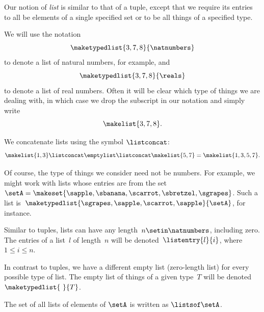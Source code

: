 Our notion of \emph{list} is similar to that of a tuple, except that we require its entries to all be elements of a single specified set or to be all things of a specified type.

We will use the notation
\begin{equation}
    \maketypedlist{3, 7, 8}{\natnumbers}
\end{equation}
to denote a list of natural numbers, for example, and
\begin{equation}
    \maketypedlist{3, 7, 8}{\reals}
\end{equation}
to denote a list of real numbers.
Often it will be clear which type of things we are dealing with, in which case we drop the subscript in our notation and simply write
\begin{equation}
    \makelist{3, 7, 8}.
\end{equation}

We concatenate lists using the symbol $\listconcat$:
\begin{equation}
    \makelist{1,3} \listconcat \emptylist \listconcat \makelist{5,7} = \makelist{1,3,5,7}.
\end{equation}

Of course, the type of things we consider need not be numbers.
For example, we might work with lists whose entries are from the set~$\setA = \makeset{\sapple, \sbanana, \scarrot, \sbretzel, \sgrapes}$.
Such a list is~$\maketypedlist{\sgrapes, \sapple, \scarrot, \sapple}{\setA}$, for instance.

Similar to tuples, lists can have any length~$n \setin \natnumbers$, including zero.
The entries of a list~$l$ of length~$n$ will be denoted~$\listentry{l}{i}$, where~$1 \leq i \leq n$.

In contrast to tuples, we have a different empty list (zero-length list) for every possible type of list.
The empty list of things of a given type~$T$ will be denoted~$\maketypedlist{\ }{T}$.

The set of all lists of elements of $\setA$ is written as $\listsof\setA$.
